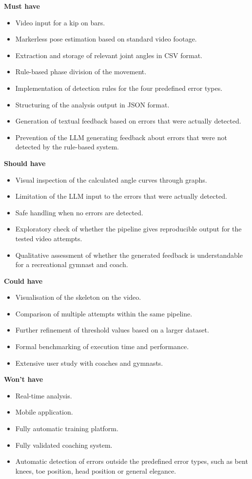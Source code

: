 \textbf{Must have}
\begin{itemize}
    \item Video input for a kip on bars.
    \item Markerless pose estimation based on standard video footage.
    \item Extraction and storage of relevant joint angles in CSV format.
    \item Rule-based phase division of the movement.
    \item Implementation of detection rules for the four predefined error types.
    \item Structuring of the analysis output in JSON format.
    \item Generation of textual feedback based on errors that were actually detected.
    \item Prevention of the LLM generating feedback about errors that were not detected by the rule-based system.
\end{itemize}

\textbf{Should have}
\begin{itemize}
    \item Visual inspection of the calculated angle curves through graphs.
    \item Limitation of the LLM input to the errors that were actually detected.
    \item Safe handling when no errors are detected.
    \item Exploratory check of whether the pipeline gives reproducible output for the tested video attempts.
    \item Qualitative assessment of whether the generated feedback is understandable for a recreational gymnast and coach.
\end{itemize}

\textbf{Could have}
\begin{itemize}
    \item Visualisation of the skeleton on the video.
    \item Comparison of multiple attempts within the same pipeline.
    \item Further refinement of threshold values based on a larger dataset.
    \item Formal benchmarking of execution time and performance.
    \item Extensive user study with coaches and gymnasts.
\end{itemize}

\textbf{Won't have}
\begin{itemize}
    \item Real-time analysis.
    \item Mobile application.
    \item Fully automatic training platform.
    \item Fully validated coaching system.
    \item Automatic detection of errors outside the predefined error types, such as bent knees, toe position, head position or general elegance.
\end{itemize}

